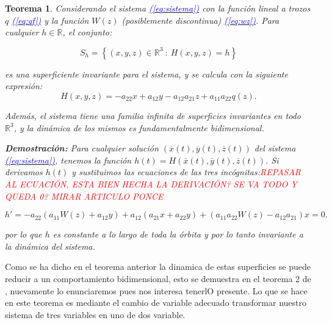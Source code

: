 \documentclass[12pt,a4paper]{report} %
\newtheorem{theorem}{Teorema}
\newcommand{\eref}[1]{\hyperref[#1]{\textcolor{blue}{\textit{(\ref*{#1})}}}}
\begin{document}
	\begin{theorem}
		\label{teorema1}
		Considerando el sistema \eref{eq:sistema} con la función lineal a trozos $q$ \eref{eq:qf} y la función $W(z)$ (posiblemente discontinua) \eref{eq:wz}. Para cualquier $h \in \mathbb{R}$, el conjunto:
		
		\begin{equation}
			\label{eq:sh}
			S_h=\left\{(x,y,z)\in \mathbb{R}^3\: : \: H(x,y,z)=h \right\}
		\end{equation}\smallskip
		
		\noindent es una superficiente invariante para el sistema, y se calcula con la siguiente expresión:
		\begin{equation}
			\label{eq:hecuation}
			H(x,y,z)=-a_{22}x+a_{12}y-a_{12}a_{21}z+a_{11}a_{22}q(z).
		\end{equation}\smallskip
		
		\noindent Además, el sistema tiene una familia infinita de superficies invariantes en todo $\mathbb{R}^3$, y la dinámica de los mismos es fundamentalmente bidimensional.
		
		\vspace{0.5cm}\noindent \textbf{Demostración:} Para cualquier solución $(\overline{x}(t),\overline{y}(t),\overline{z}(t))$ del sistema \eref{eq:sistema}, tenemos la función $h(t)=H(\overline{x}(t),\overline{y}(t),\overline{z}(t))$. Si derivamos $h(t)$ y sustituimos las ecuaciones de las tres incógnitas:\textit{\textcolor{red}{REPASAR AL ECUACIÓN, ESTA BIEN HECHA LA DERIVACIÓN? SE VA TODO Y QUEDA 0? MIRAR ARTICULO PONCE}}
		
		\begin{equation}
				h'=-a_{22}(a_{11}W(z)+a_{12}y)+a_{12}(a_{21}x+a_{22}y)+(a_{11}a_{22}W(z)-a_{12}a_{21})x=0.
		\end{equation}\smallskip

		\noindent por lo que $h$ es constante a lo largo de toda la órbita y por lo tanto invariante a la dinámica del sistema.
	\end{theorem}
	
	Como se ha dicho en el teorema anterior la dinamica de estas superficies se puede reducir a un comportamiento bidimensional, esto se demuestra en el teorema 2 de \cite{ponce}, nuevamente lo enunciaremos pues nos interesa tenerlO presente. Lo que se hace en este teorema es mediante el cambio de variable adecuado transformar nuestro sistema de tres variables en uno de dos variable.
	
	\newpage
	
\end{document}
